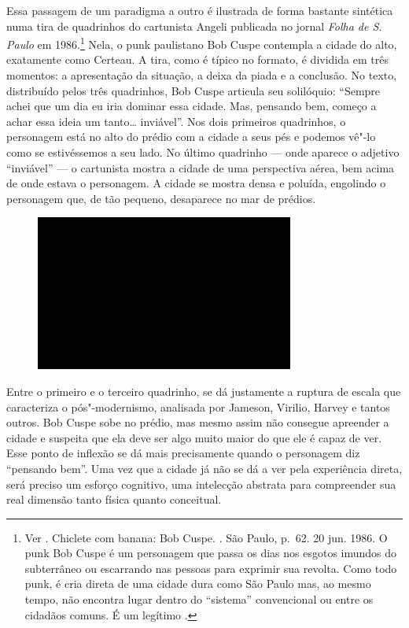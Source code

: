 Essa passagem de um paradigma a outro é ilustrada de forma bastante
sintética numa tira de quadrinhos do cartunista Angeli publicada no
jornal \emph{Folha de S. Paulo} em 1986.\footnote{Ver . Chiclete
  com banana: Bob Cuspe. {}. São Paulo, p.~62.
  20 jun. 1986. O punk Bob Cuspe é um personagem que passa os dias nos
  esgotos imundos do subterrâneo ou escarrando nas pessoas para exprimir
  sua revolta. Como todo punk, é cria direta de uma cidade dura como São
  Paulo mas, ao mesmo tempo, não encontra lugar dentro do ``sistema''
  convencional ou entre os cidadãos comuns. É um legítimo
  {}.} Nela, o punk paulistano Bob Cuspe contempla a cidade
do alto, exatamente como Certeau. A tira, como é típico no formato, é
dividida em três momentos: a apresentação da situação, a deixa da piada
e a conclusão. No texto, distribuído pelos três quadrinhos, Bob Cuspe
articula seu solilóquio: ``Sempre achei que um dia eu iria dominar essa
cidade. Mas, pensando bem, começo a achar essa ideia um
tanto\ldots{} inviável''. Nos dois primeiros quadrinhos, o personagem
está no alto do prédio com a cidade a seus pés e podemos vê"-lo como se
estivéssemos a seu lado. No último quadrinho --- onde aparece o adjetivo
``inviável'' --- o cartunista mostra a cidade de uma perspectiva aérea,
bem acima de onde estava o personagem. A cidade se mostra densa e
poluída, engolindo o personagem que, de tão pequeno, desaparece no mar
de prédios.

\begin{figure}[!ht]

\centering
 \includegraphics[width=85mm]{./imgs/im1.jpg}
\caption{\tiny{}}

\end{figure}

Entre o primeiro e o terceiro quadrinho, se dá justamente a ruptura de
escala que caracteriza o pós"-modernismo, analisada por Jameson, Virilio,
Harvey e tantos outros. Bob Cuspe sobe no prédio, mas mesmo assim não
consegue apreender a cidade e suspeita que ela deve ser algo muito maior
do que ele é capaz de ver. Esse ponto de inflexão se dá mais
precisamente quando o personagem diz ``pensando bem''. Uma vez que a
cidade já não se dá a ver pela experiência direta, será preciso um
esforço cognitivo, uma intelecção abstrata para compreender sua real
dimensão tanto física quanto conceitual.

